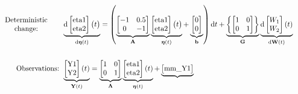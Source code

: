 \documentclass[a4paper]{article}
\newcommand{\vect}[1]{\boldsymbol{\mathbf{#1}}}
\begin{document}
 \begin{normalsize}
 \setcounter{MaxMatrixCols}{200}
  \begin{align*}
      \parbox{10em}{\centering{Deterministic\linebreak change:}}
  &\underbrace{\mathrm{d}
    \begin{bmatrix}
\text{eta1}\\ 
\text{eta2}
\end{bmatrix} 
    \big{(}t\big{)}}_{\mathrm{d} \vect{\eta} (t)}	=  \left(
      \underbrace{
        \begin{bmatrix}
-1 & 0.5\\ 
0 & -1
\end{bmatrix}
      }_{{\vect{A}}} \underbrace{
        \begin{bmatrix}
\text{eta1}\\ 
\text{eta2}
\end{bmatrix} 
        \big{(}t\big{)}
      }_{\vect{\eta} (t)}	+ \underbrace{
        \begin{bmatrix}
0\\ 
0
\end{bmatrix}
      }_{{\vect{b}}}\right) \mathrm{d}t +
   \underbrace{\left\{
      \begin{bmatrix}
1 & 0\\ 
0 & 1
\end{bmatrix}\right\}
    }_{{\vect{G}}}
    \underbrace{\mathrm{d}
      \begin{bmatrix}
W_{1}\\ 
W_{2}
\end{bmatrix} 
      (t)}_{\mathrm{d} \vect{W}(t)} \\ \\
              \textrm{Observations: }
&\underbrace{
      \begin{bmatrix}
\text{Y1}\\ 
\text{Y2}
\end{bmatrix}  
      (t)}_{\vect{Y}(t)} = 
        \underbrace{
          \begin{bmatrix}
1 & 0\\ 
0 & 1
\end{bmatrix} 
        }_{{\vect{\Lambda}}} \underbrace{
          \begin{bmatrix}
\text{eta1}\\ 
\text{eta2}
\end{bmatrix} 
          (t)}_{\vect{\eta}(t)} +
        \underbrace{
          \begin{bmatrix}
\text{mm\_Y1}\\ 

\end{bmatrix}}
\end{align*}
\end{normalsize}
\end{document}

